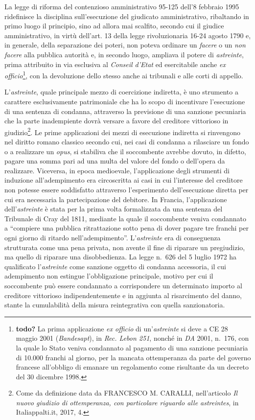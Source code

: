 \documentclass[12pt,it,a4paper,]{report}
\begin{document}
La legge di riforma del contenzioso amministrativo 95-125 dell'8
febbraio 1995 ridefinisce la disciplina sull'esecuzione del giudicato
amministrativo, ribaltando in primo luogo il principio, sino ad allora
mai scalfito, secondo cui il giudice amministrativo, in virtù dell'art.
13 della legge rivoluzionaria 16-24 agosto 1790 e, in generale, della
separazione dei poteri, non poteva ordinare un \emph{facere} o un
\emph{non facere} alla pubblica autorità e, in secondo luogo, ampliava
il potere di \emph{astreinte}, prima attribuito in via esclusiva al
\emph{Conseil d'Etat} ed esercitabile anche \emph{ex
officio}\footnote{\textbf{todo?} La prima applicazione \emph{ex officio}
  di un'\emph{astreinte} si deve a CE 28 maggio 2001 (\emph{Bandesapt}),
  in \emph{Rec. Lebon 251}, nonché in \emph{DA} 2001, n.~176, con la
  quale lo Stato veniva condannato al pagamento di una sanzione
  pecuniaria di 10.000 franchi al giorno, per la mancata ottemperanza da
  parte del governo francese all'obbligo di emanare un regolamento come
  risultante da un decreto del 30 dicembre 1998.}, con la devoluzione
dello stesso anche ai tribunali e alle corti di appello.

L'\emph{astreinte}, quale principale mezzo di coercizione indiretta, è
uno strumento a carattere esclusivamente patrimoniale che ha lo scopo di
incentivare l'esecuzione di una sentenza di condanna, attraverso la
previsione di una sanzione pecuniaria che la parte inadempiente dovrà
versare a favore del creditore vittorioso in giudizio\footnote{Come da
  definizione data da FRANCESCO M. CARALLI, nell'articolo \emph{Il nuovo
  giudizio di ottemperanza, con particolare riguardo alle astreintes},
  in Italiappalti.it, 2017, 4.}. Le prime applicazioni dei mezzi di
esecuzione indiretta si rinvengono nel diritto romano classico secondo
cui, nei casi di condanna a rilasciare un fondo o a realizzare un
\emph{opus}, si stabiliva che il soccombente avrebbe dovuto, in difetto,
pagare una somma pari ad una multa del valore del fondo o dell'opera da
realizzare. Viceversa, in epoca medioevale, l'applicazione degli
strumenti di induzione all'adempimento era circoscritta ai casi in cui
l'interesse del creditore non potesse essere soddisfatto attraverso
l'esperimento dell'esecuzione diretta per cui era necessaria la
partecipazione del debitore. In Francia, l'applicazione
dell'\emph{astreinte} è stata per la prima volta formalizzata da una
sentenza del Tribunale di Cray del 1811, mediante la quale il
soccombente veniva condannato a ``compiere una pubblica ritrattazione
sotto pena di dover pagare tre franchi per ogni giorno di ritardo
nell'adempimento''. L'\emph{astreinte} era di conseguenza strutturata
come una pena privata, non avente il fine di riparare un pregiudizio, ma
quello di riparare una disobbedienza. La legge n.~626 del 5 luglio 1972
ha qualificato l'\emph{astreinte} come sanzione oggetto di condanna
accessoria, il cui adempimento non estingue l'obbligazione principale,
motivo per cui il soccombente può essere condannato a corrispondere un
determinato importo al creditore vittorioso indipendentemente e in
aggiunta al risarcimento del danno, stante la cumulabilità della misura
reintegrativa con quella sanzionatoria.
\end{document}
